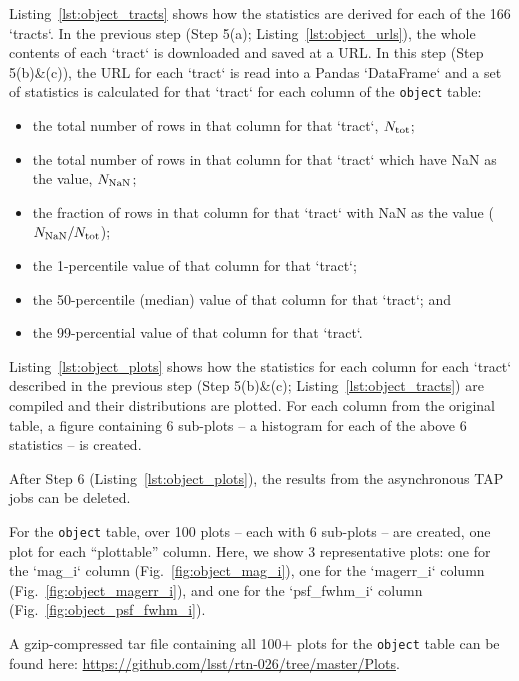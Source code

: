 \documentclass[DM,authoryear,toc]{lsstdoc}
\begin{document}
Listing~\ref{lst:object_tracts} shows how the statistics are derived
for each of the 166 `tracts`.  In the previous step (Step 5(a);
Listing~\ref{lst:object_urls}), the whole contents of each `tract` is
downloaded and saved at a URL.  In this step (Step 5(b)\&(c)), the URL
for each `tract` is read into a Pandas `DataFrame` and a set of
statistics is calculated for that `tract` for each column of the 
\texttt{object} table:
\begin{itemize}
\item the total number of rows in that column for that `tract`, $N_{\rm tot}$;
\item the total number of rows in that column for that `tract` which have NaN as the value, $N_{\rm NaN}$;
\item the fraction of rows in that column for that `tract` with NaN as the value ($N_{\rm NaN} / N_{\rm tot}$);
\item the 1-percentile value of that column for that `tract`;
\item the 50-percentile (median) value of that column for that `tract`; and 
\item the 99-percential value of that column for that `tract`.
\end{itemize}

Listing~\ref{lst:object_plots} shows how the statistics for each
column for each `tract` described in the previous step (Step
5(b)\&(c); Listing~\ref{lst:object_tracts}) are compiled and their
distributions are plotted.  For each column from the original table, a
figure containing 6 sub-plots -- a histogram for each of the above 6
statistics -- is created.

After Step 6 (Listing~\ref{lst:object_plots}), the results from the
asynchronous TAP jobs can be deleted.

For the \texttt{object} table, over 100 plots -- each with 6 sub-plots
-- are created, one plot for each ``plottable'' column.  Here, we show
3 representative plots: one for the `mag\_i` column
(Fig.~\ref{fig:object_mag_i}), one for the `magerr\_i` column
(Fig.~\ref{fig:object_magerr_i}), and one for the `psf\_fwhm\_i` column
(Fig.~\ref{fig:object_psf_fwhm_i}).

A gzip-compressed tar file containing all 100$+$ plots for the
\texttt{object} table can be found here:
\url{https://github.com/lsst/rtn-026/tree/master/Plots}.
\end{document}
